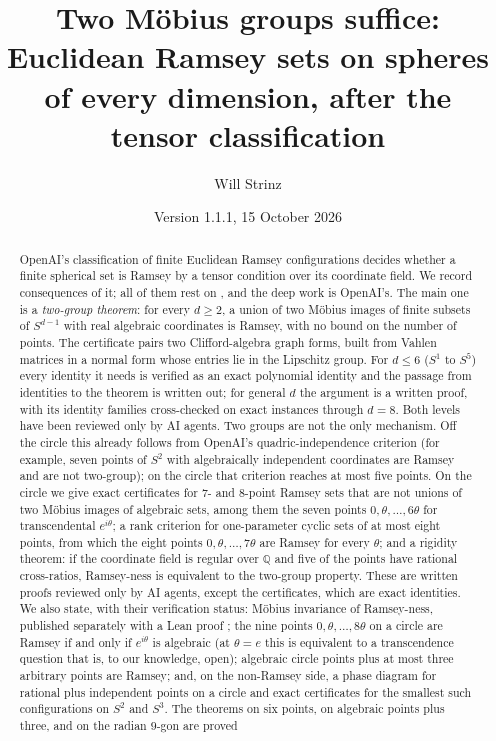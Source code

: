 \documentclass[11pt]{amsart}
\title[Two M\"obius groups suffice]{Two M\"obius groups suffice: Euclidean Ramsey sets on spheres of
every dimension, after the tensor classification}
\author{Will Strinz}
\date{Version 1.1.1, 15 October 2026}
\newcommand{\Q}{\mathbb{Q}}
\theoremstyle{plain}
\theoremstyle{definition}
\begin{document}
\begin{abstract}
OpenAI's classification of finite Euclidean Ramsey configurations \cite{OAI172} decides whether a
finite spherical set is Ramsey by a tensor condition over its coordinate field. We record
consequences of it; all of them rest on \cite{OAI172}, and the deep work is OpenAI's.
The main one is a \emph{two-group theorem}: for every $d\ge2$, a union of two M\"obius images of
finite subsets of $S^{d-1}$ with real algebraic coordinates is Ramsey, with no bound on the number
of points. The certificate pairs two Clifford-algebra graph forms, built from Vahlen matrices in a
normal form whose entries lie in the Lipschitz group. For $d\le6$ ($S^1$ to $S^5$) every identity
it needs is verified as an exact polynomial identity and the passage from identities to the
theorem is written out; for general $d$ the argument is a written proof, with its identity families
cross-checked on exact instances through $d=8$. Both levels have been reviewed only by AI agents.
Two groups are not the only mechanism. Off the circle this already follows from OpenAI's
quadric-independence criterion \cite[Prop.~7.3]{OAI172} (for example, seven points of $S^2$ with
algebraically independent coordinates are Ramsey and are not two-group); on the circle that criterion
reaches at most five points. On the circle we give exact certificates for $7$- and
$8$-point Ramsey sets that are not unions of two M\"obius images of algebraic sets, among them the
seven points $0,\theta,\dots,6\theta$ for transcendental $e^{i\theta}$; a rank criterion for
one-parameter cyclic sets of at most eight points, from which the eight points
$0,\theta,\dots,7\theta$ are Ramsey for every $\theta$; and a rigidity theorem: if the coordinate
field is regular over $\Q$ and five of the points have rational cross-ratios, Ramsey-ness is
equivalent to the two-group property. These are written proofs reviewed only by AI agents, except
the certificates, which are exact identities.
We also state, with their verification status: M\"obius invariance of Ramsey-ness, published
separately with a Lean proof \cite{MR}; the nine points $0,\theta,\dots,8\theta$ on a circle are
Ramsey if and only if $e^{i\theta}$ is algebraic (at $\theta=e$ this is equivalent to a
transcendence question that is, to our knowledge, open); algebraic circle points plus at most
three arbitrary points are Ramsey; and, on the non-Ramsey side, a phase diagram for rational plus
independent points on a circle and exact certificates for the smallest such configurations on
$S^2$ and $S^3$. The theorems on six points, on algebraic points plus three, and on the radian $9$-gon are proved

\end{abstract}
\end{document}
